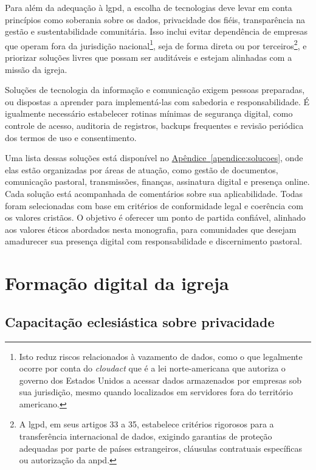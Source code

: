 Para além da adequação à \gls{lgpd}, a escolha de tecnologias deve levar em conta princípios como soberania sobre os dados, privacidade dos fiéis, transparência na gestão e sustentabilidade comunitária. Isso inclui evitar dependência de empresas que operam fora da jurisdição nacional\footnote{Isto reduz riscos relacionados à vazamento de dados, como o que legalmente ocorre por conta do \textit{\gls{cloudact}} que é a lei norte-americana que autoriza o governo dos Estados Unidos a acessar dados armazenados por empresas sob sua jurisdição, mesmo quando localizados em servidores fora do território americano\cite{harvard_cloudact_2018,brooklyn_cloudact_2020}.}, seja de forma direta ou por terceiros\footnote{A \gls{lgpd}, em seus artigos 33 a 35, estabelece critérios rigorosos para a transferência internacional de dados, exigindo garantias de proteção adequadas por parte de países estrangeiros, cláusulas contratuais específicas ou autorização da \gls{anpd}.}, e priorizar soluções livres que possam ser auditáveis e estejam alinhadas com a missão da igreja.

Soluções de tecnologia da informação e comunicação exigem pessoas preparadas, ou dispostas a aprender para implementá-las com sabedoria e responsabilidade. É igualmente necessário estabelecer rotinas mínimas de segurança digital, como controle de acesso, auditoria de registros, backups frequentes e revisão periódica dos termos de uso e consentimento.

Uma lista dessas soluções está disponível no \hyperref[apendice:solucoes]{Apêndice~\ref*{apendice:solucoes}}, onde elas estão organizadas por áreas de atuação, como gestão de documentos, comunicação pastoral, transmissões, finanças, assinatura digital e presença online. Cada solução está acompanhada de comentários sobre sua aplicabilidade. Todas foram selecionadas com base em critérios de conformidade legal e coerência com os valores cristãos. O objetivo é oferecer um ponto de partida confiável, alinhado aos valores éticos abordados nesta monografia, para comunidades que desejam amadurecer sua presença digital com responsabilidade e discernimento pastoral.

\section{Formação digital da igreja}

\subsection{Capacitação eclesiástica sobre privacidade}

